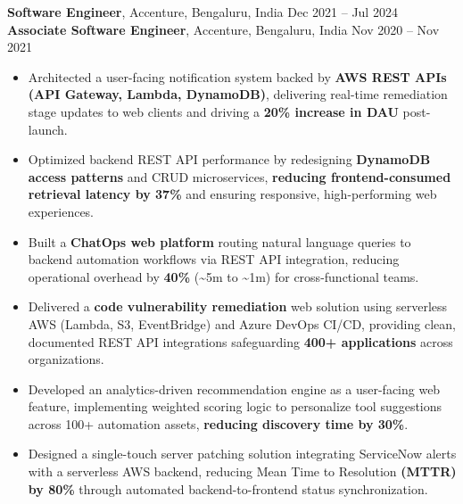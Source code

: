 \documentclass[letterpaper,10.5pt]{extarticle}
\begin{document}
\noindent\textbf{Software Engineer}, Accenture, Bengaluru, India \hfill Dec 2021 -- Jul 2024\\
\textbf{Associate Software Engineer}, Accenture, Bengaluru, India \hfill Nov 2020 -- Nov 2021

\begin{itemize}[leftmargin=12pt, topsep=1pt, itemsep=0pt, parsep=0pt]
    \item Architected a user-facing notification system backed by \textbf{AWS REST APIs (API Gateway, Lambda, DynamoDB)}, delivering real-time remediation stage updates to web clients and driving a \textbf{20\% increase in DAU} post-launch.
    \item Optimized backend REST API performance by redesigning \textbf{DynamoDB access patterns} and CRUD microservices, \textbf{reducing frontend-consumed retrieval latency by 37\%} and ensuring responsive, high-performing web experiences.
    \item Built a \textbf{ChatOps web platform} routing natural language queries to backend automation workflows via REST API integration, reducing operational overhead by \textbf{40\%} (\textasciitilde5m to \textasciitilde1m) for cross-functional teams.
    \item Delivered a \textbf{code vulnerability remediation} web solution using serverless AWS (Lambda, S3, EventBridge) and Azure DevOps CI/CD, providing clean, documented REST API integrations safeguarding \textbf{400+ applications} across organizations.
    \item Developed an analytics-driven recommendation engine as a user-facing web feature, implementing weighted scoring logic to personalize tool suggestions across 100+ automation assets, \textbf{reducing discovery time by 30\%}.
    \item Designed a single-touch server patching solution integrating ServiceNow alerts with a serverless AWS backend, reducing Mean Time to Resolution \textbf{(MTTR) by 80\%} through automated backend-to-frontend status synchronization.
\end{itemize}
\end{document}
